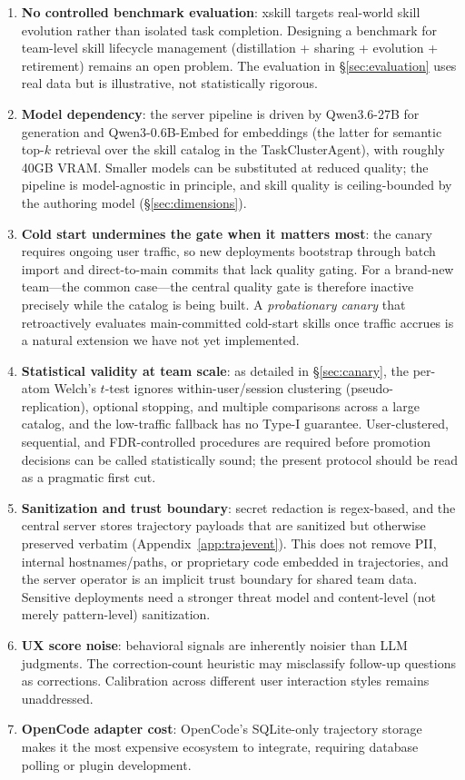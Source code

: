 \documentclass{article}
\begin{document}
\begin{enumerate}
    \item \textbf{No controlled benchmark evaluation}: xskill targets real-world skill evolution rather than isolated task completion. Designing a benchmark for team-level skill lifecycle management (distillation + sharing + evolution + retirement) remains an open problem. The evaluation in \S\ref{sec:evaluation} uses real data but is illustrative, not statistically rigorous.
    \item \textbf{Model dependency}: the server pipeline is driven by Qwen3.6-27B for generation and Qwen3-0.6B-Embed for embeddings (the latter for semantic top-$k$ retrieval over the skill catalog in the TaskClusterAgent), with roughly 40GB VRAM. Smaller models can be substituted at reduced quality; the pipeline is model-agnostic in principle, and skill quality is ceiling-bounded by the authoring model (\S\ref{sec:dimensions}).
    \item \textbf{Cold start undermines the gate when it matters most}: the canary requires ongoing user traffic, so new deployments bootstrap through batch import and direct-to-main commits that lack quality gating. For a brand-new team---the common case---the central quality gate is therefore inactive precisely while the catalog is being built. A \emph{probationary canary} that retroactively evaluates main-committed cold-start skills once traffic accrues is a natural extension we have not yet implemented.
    \item \textbf{Statistical validity at team scale}: as detailed in \S\ref{sec:canary}, the per-atom Welch's $t$-test ignores within-user/session clustering (pseudo-replication), optional stopping, and multiple comparisons across a large catalog, and the low-traffic fallback has no Type-I guarantee. User-clustered, sequential, and FDR-controlled procedures are required before promotion decisions can be called statistically sound; the present protocol should be read as a pragmatic first cut.
    \item \textbf{Sanitization and trust boundary}: secret redaction is regex-based, and the central server stores trajectory payloads that are sanitized but otherwise preserved verbatim (Appendix~\ref{app:trajevent}). This does not remove PII, internal hostnames/paths, or proprietary code embedded in trajectories, and the server operator is an implicit trust boundary for shared team data. Sensitive deployments need a stronger threat model and content-level (not merely pattern-level) sanitization.
    \item \textbf{UX score noise}: behavioral signals are inherently noisier than LLM judgments. The correction-count heuristic may misclassify follow-up questions as corrections. Calibration across different user interaction styles remains unaddressed.
    \item \textbf{OpenCode adapter cost}: OpenCode's SQLite-only trajectory storage makes it the most expensive ecosystem to integrate, requiring database polling or plugin development.
\end{enumerate}
\end{document}
